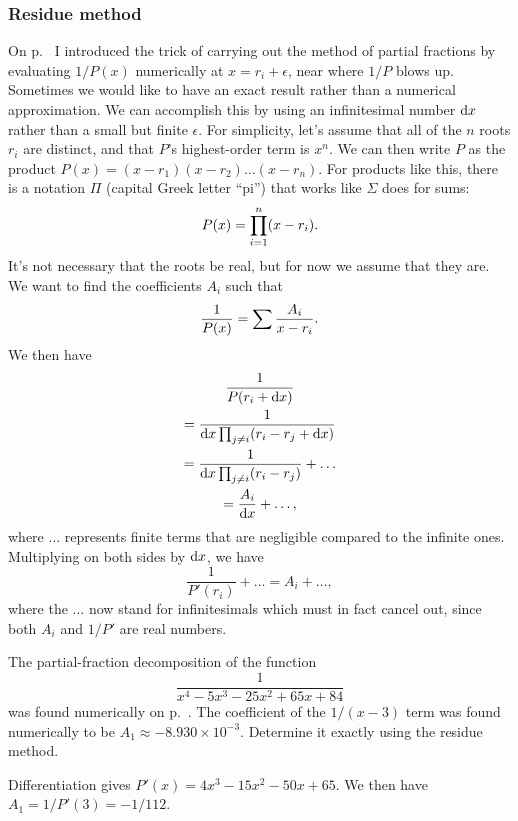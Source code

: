 \subsubsection{Residue method}
On p.~\pageref{residue-method-numerical} I introduced the trick of carrying out the method of partial fractions
by evaluating $1/P(x)$ numerically at $x=r_i+\epsilon$, near where $1/P$ blows up. Sometimes we would like
to have an exact result rather than a numerical approximation. We can accomplish this by using an infinitesimal
number $\operatorname{d\!} x$ rather than a small but finite $\epsilon$. For simplicity, let's assume that all of the $n$ roots $r_i$
are distinct, and that $P$'s highest-order term is $x^n$. We can then write $P$ as the product 
$P(x)=(x-r_1)(x-r_2)\ldots(x-r_n)$. For products like this, there is a notation $\Pi$ (capital Greek letter ``pi'')
that works like $\Sigma$ does for sums: 
\begin{equation*}
  P(x)=\prod_{i=1}^n(x-r_i).
\end{equation*}
It's not necessary that the roots be real, but for now we assume that they are.
We want to find the coefficients $A_i$ such that
\begin{equation*}
  \frac{1}{P(x)} = \sum \frac{A_i}{x-r_i}.
\end{equation*}
We then have
\begin{gather*}
  \frac{1}{P(r_i+\operatorname{d\!} x)} \\
          = \frac{1}{\operatorname{d\!} x \prod_{j\ne i}(r_i-r_j+\operatorname{d\!} x)} \\
          = \frac{1}{\operatorname{d\!} x \prod_{j\ne i}(r_i-r_j)} + \ldots \\
          = \frac{A_i}{\operatorname{d\!} x}+\ldots ,
\end{gather*}
where $\ldots$ represents finite terms that are negligible compared to the infinite ones. Multiplying on
both sides by $\operatorname{d\!} x$, we have
\begin{equation*}
  \frac{1}{P'(r_i)} + \ldots = A_i + \ldots ,
\end{equation*}
where the $\ldots$ now stand for infinitesimals which must in fact cancel out, since both $A_i$ and
$1/P'$ are real numbers.

\begin{eg}
\egquestion The partial-fraction decomposition of the function
\begin{equation*}
\frac{1}{x^4-5x^3-25x^2+65x+84}
\end{equation*}
was found numerically on p.~\pageref{partial-fractions-numerical}. The coefficient
of the $1/(x-3)$ term was found numerically to be $A_1\approx -8.930\times10^{-3}$.
Determine it exactly using the residue method.

\eganswer
Differentiation gives $P'(x)=4x^3-15x^2-50x+65$. We then have
$A_1=1/P'(3)=-1/112$.

\end{eg}

